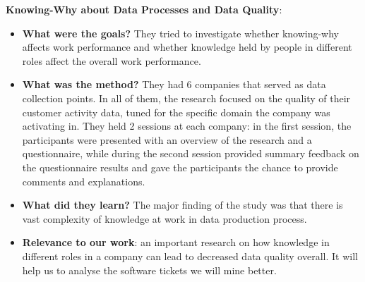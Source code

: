 \documentclass{mprop}
\begin{document}
\textbf{Knowing-Why about Data Processes and Data Quality}\cite{lee2003knowing}:
\begin{itemize}
  \item \textbf{What were the goals?}
    They tried to investigate whether knowing-why affects work performance and
    whether knowledge held by people in different roles affect the overall work
    performance. 
  \item \textbf{What was the method?}
    They had 6 companies that served as data collection points. In all of them,
    the research focused on the quality of their customer activity data, tuned
    for the specific domain the company was activating in. They held 2 sessions
    at each company: in the first session, the participants were presented with
    an overview of the research and a questionnaire, while during the second 
    session provided summary feedback on the questionnaire results and gave the
    participants the chance to provide comments and explanations.
  \item \textbf{What did they learn?}
    The major finding of the study was that there is vast complexity of knowledge
    at work in data production process. 
  \item \textbf{Relevance to our work}: an important research on how knowledge in
    different roles in a company can lead to decreased data quality overall. It
    will help us to analyse the software tickets we will mine better.
\end{itemize}
\end{document}
